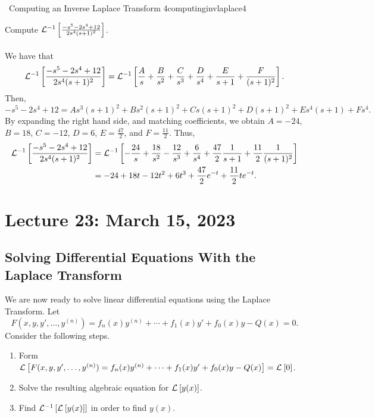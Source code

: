         \begin{example}{\Difficulty\,\Difficulty\,\,Computing an Inverse Laplace Transform 4}{computinginvlaplace4}

            Compute \(\laplace[-1]{\frac{-s^5-2s^4+12}{2s^4(s+1)^2}}\).
            \\
            \\
            We have that
            \begin{equation*}
                \laplace[-1]{\frac{-s^5-2s^4+12}{2s^4(s+1)^2}}=\laplace[-1]{\frac{A}{s}+\frac{B}{s^2}+\frac{C}{s^3}+\frac{D}{s^4}+\frac{E}{s+1}+\frac{F}{(s+1)^2}}.
            \end{equation*}
            Then,
            \begin{equation*}
                -s^5-2s^4+12=As^3(s+1)^2+Bs^2(s+1)^2+Cs(s+1)^2+D(s+1)^2+Es^4(s+1)+Fs^4.
            \end{equation*}
            By expanding the right hand side, and matching coefficients, we obtain \(A=-24\), \(B=18\), \(C=-12\), \(D=6\), \(E=\frac{47}{2}\), and \(F=\frac{11}{2}\). Thus,
            \begin{align*}
                \laplace[-1]{\frac{-s^5-2s^4+12}{2s^4(s+1)^2}}&=\laplace[-1]{-\frac{24}{s}+\frac{18}{s^2}-\frac{12}{s^3}+\frac{6}{s^4}+\frac{47}{2}\frac{1}{s+1}+\frac{11}{2}\frac{1}{(s+1)^2}} \\
                &=-24+18t-12t^2+6t^3+\frac{47}{2}e^{-t}+\frac{11}{2}te^{-t}.
            \end{align*}

        \end{example}

\pagebreak

\section{Lecture 23: March 15, 2023}

    \subsection{Solving Differential Equations With the Laplace Transform}
    
        We are now ready to solve linear differential equations using the Laplace Transform. Let
        \begin{equation*}
            F(x,y,y',\ldots,y^{(n)})=f_n(x)y^{(n)}+\cdots+f_1(x)y'+f_0(x)y-Q(x)=0.
        \end{equation*}
        Consider the following steps.
        \begin{enumerate}
            \item Form \(\laplace{F(x,y,y',\ldots,y^{(n)})=f_n(x)y^{(n)}+\cdots+f_1(x)y'+f_0(x)y-Q(x)}=\laplace{0}\).
            \item Solve the resulting algebraic equation for \(\laplace{y(x)}\).
            \item Find \(\laplace[-1]{\laplace{y(x)}}\) in order to find \(y(x)\).
        \end{enumerate}

